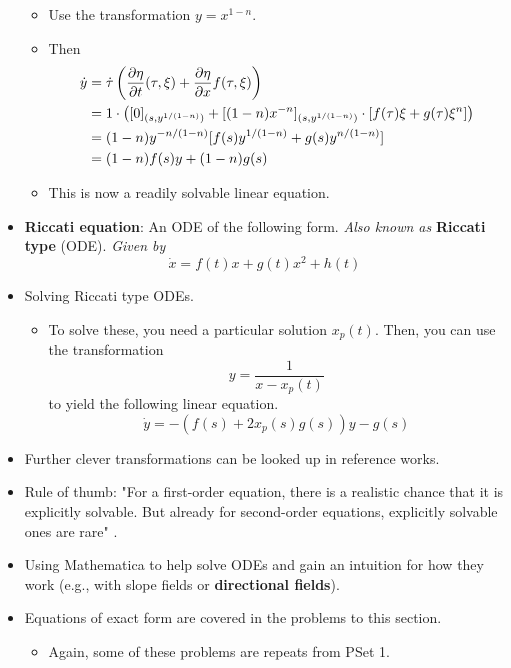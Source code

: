 \documentclass[../notes.tex]{subfiles}
\begin{document}
\begin{itemize}
\begin{itemize}
        \item Use the transformation $y=x^{1-n}$.
        \item Then
        \begin{align*}
            \dot{y} &= \dot{\tau}\left( {\pdv{\eta}{t}}(\tau,\xi)+\pdv{\eta}{x}(\tau,\xi)f(\tau,\xi) \right)\\
            &= 1\cdot\left( [0]_{(s,y^{1/(1-n)})}+[(1-n)x^{-n}]_{(s,y^{1/(1-n)})}\cdot[f(\tau)\xi+g(\tau)\xi^n] \right)\\
            &= (1-n)y^{-n/(1-n)}[f(s)y^{1/(1-n)}+g(s)y^{n/(1-n)}]\\
            &= (1-n)f(s)y+(1-n)g(s)
        \end{align*}
        \item This is now a readily solvable linear equation.
    \end{itemize}
    \item \textbf{Riccati equation}: An ODE of the following form. \emph{Also known as} \textbf{Riccati type} (ODE). \emph{Given by}
    \begin{equation*}
        \dot{x} = f(t)x+g(t)x^2+h(t)
    \end{equation*}
    \item Solving Riccati type ODEs.
    \begin{itemize}
        \item To solve these, you need a particular solution $x_p(t)$. Then, you can use the transformation
        \begin{equation*}
            y = \frac{1}{x-x_p(t)}
        \end{equation*}
        to yield the following linear equation.
        \begin{equation*}
            \dot{y} = -(f(s)+2x_p(s)g(s))y-g(s)
        \end{equation*}
    \end{itemize}
    \item Further clever transformations can be looked up in reference works.
    \item Rule of thumb: "For a first-order equation, there is a realistic chance that it is explicitly solvable. But already for second-order equations, explicitly solvable ones are rare" \parencite[16]{bib:Teschl}.
    \item Using Mathematica to help solve ODEs and gain an intuition for how they work (e.g., with slope fields or \textbf{directional fields}).
    \item Equations of exact form are covered in the problems to this section.
    \begin{itemize}
        \item Again, some of these problems are repeats from PSet 1.
    \end{itemize}
\end{itemize}
\end{document}
